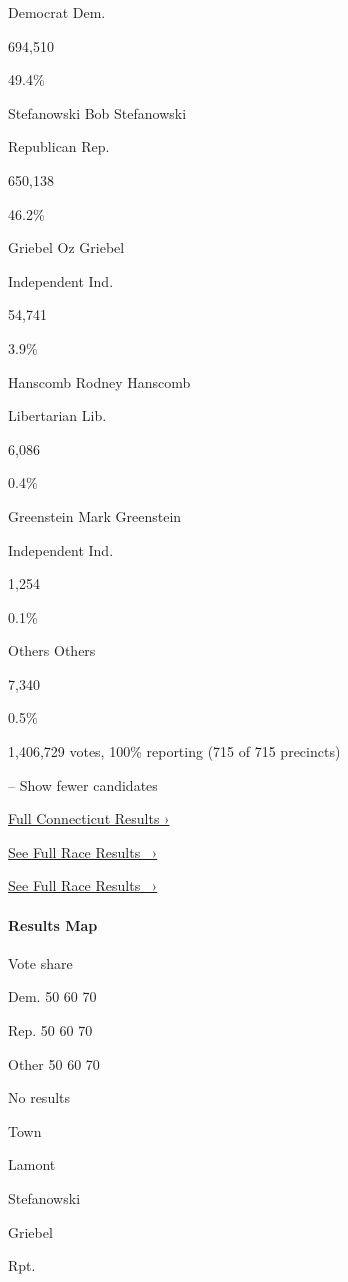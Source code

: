 Democrat Dem.

694,510

49.4\%

 Stefanowski Bob Stefanowski

Republican Rep.

650,138

46.2\%

 Griebel Oz Griebel

Independent Ind.

54,741

3.9\%

 Hanscomb Rodney Hanscomb

Libertarian Lib.

6,086

0.4\%

 Greenstein Mark Greenstein

Independent Ind.

1,254

0.1\%

 Others Others

7,340

0.5\%

1,406,729 votes, 100\% reporting (715 of 715 precincts)

-- Show fewer candidates

\href{https://www.nytimes3xbfgragh.onion/interactive/2018/11/06/us/elections/results-connecticut-elections.html}{Full
Connecticut Results ›}

\href{https://www.nytimes3xbfgragh.onion/elections/results/connecticut-governor}{See
Full Race Results~ ›}

\href{https://www.nytimes3xbfgragh.onion/elections/results/connecticut-governor}{See
Full Race Results~ ›}

\hypertarget{results-map-1}{%
\paragraph{Results Map}\label{results-map-1}}

Vote share

Dem. 50 60 70

Rep. 50 60 70

Other 50 60 70

No results

Town

Lamont

Stefanowski

Griebel

Rpt.

